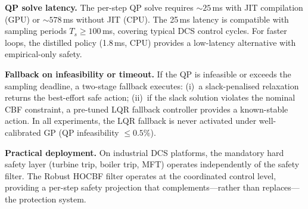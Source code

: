 \textbf{QP solve latency.} The per-step QP solve requires ${\sim}25$\,ms with JIT compilation (GPU) or ${\sim}578$\,ms without JIT (CPU). The 25\,ms latency is compatible with sampling periods $T_s \geq 100$\,ms, covering typical DCS control cycles. For faster loops, the distilled policy (1.8\,ms, CPU) provides a low-latency alternative with empirical-only safety.

\textbf{Fallback on infeasibility or timeout.} If the QP is infeasible or exceeds the sampling deadline, a two-stage fallback executes: (i)~a slack-penalised relaxation returns the best-effort safe action; (ii)~if the slack solution violates the nominal CBF constraint, a pre-tuned LQR fallback controller provides a known-stable action. In all experiments, the LQR fallback is never activated under well-calibrated GP (QP infeasibility $\leq 0.5\%$).

\textbf{Practical deployment.} On industrial DCS platforms, the mandatory hard safety layer (turbine trip, boiler trip, MFT) operates independently of the safety filter. The Robust HOCBF filter operates at the coordinated control level, providing a per-step safety projection that complements---rather than replaces---the protection system.
